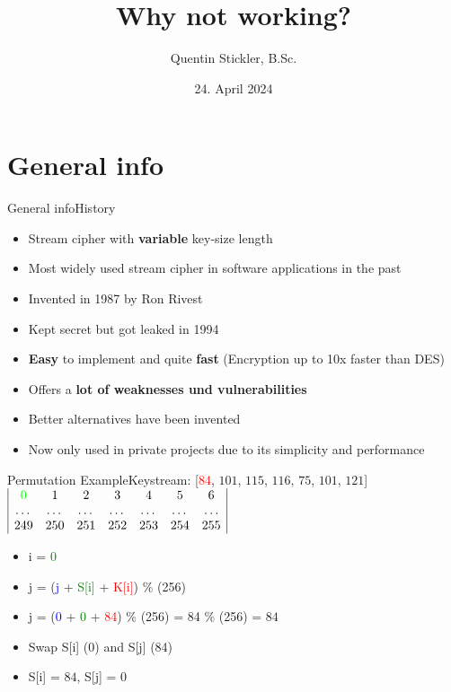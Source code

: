 \documentclass[
	aspectratio=169,	%
	onlytextwidth,		%
	t,					%
	]{beamer}
\title[Bib-Test]{Why not working?}
\author[Quentin Stickler]{Quentin Stickler, B.Sc.}
\date{24. April 2024} %
\begin{document}
\section{General info}

\begin{frame}[fragile]{General info}{History}
	\begin{itemize}
		\item Stream cipher with \textbf{variable} key-size length
		\item Most widely used stream cipher in software applications in the past
		\item Invented in 1987 by Ron Rivest
		\item Kept secret but got leaked in 1994
		\item \textbf{Easy} to implement and quite \textbf{fast} (Encryption up to 10x faster than DES)
		\item Offers a \textbf{lot of weaknesses und vulnerabilities}
		\item Better alternatives have been invented \cite{woungang20192nd}
		\item Now only used in private projects due to its simplicity and performance
	\end{itemize}
\end{frame}

\begin{frame}{Permutation Example}{Keystream: [\textcolor{red} {84}, $101$, $115$, $116$, $75$, $101$, $121$]}
	\medskip
	$\begin{array}{|ccccccc|}
		\textcolor{green}{0} & 1 & 2 & 3 & 4 & 5 & 6 \\
		\dots & \dots & \dots & \dots & \dots & \dots & \dots \\
		249 & 250 & 251 & 252 & 253 & 254 & 255 \\
	\end{array}$
	\medskip
	\begin{itemize}
		\item i = \textcolor{green}{0}
		\item j = (\textcolor{blue} {j} + \textcolor{green}{S[i]} + \textcolor{red}{K[i]}) $\%$ (256)
		\item j = (\textcolor{blue} {0} + \textcolor{green} {0} + \textcolor{red} {84}) $\%$ (256) = 84 $\%$ (256) = $84$
		\item Swap S[i] (0) and S[j] (84)
		\item S[i] = $84$, S[j] = $0$
	\end{itemize}
\end{frame}
\end{document}
